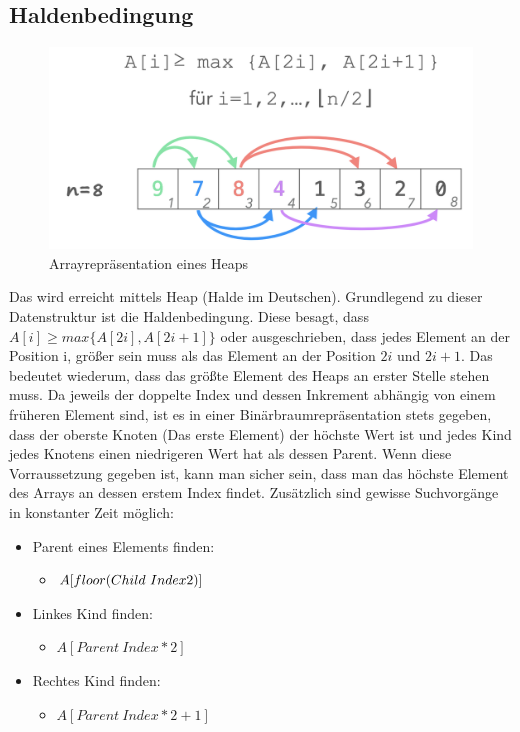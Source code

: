 \documentclass{article}
\begin{document}
	\subsection{Haldenbedingung}
	\begin{figure}[H]
	\centering
	\includegraphics{Bilder/heap.png}
	\caption{Arrayrepräsentation eines Heaps}
	\end{figure}
	Das wird erreicht mittels Heap (Halde im Deutschen). Grundlegend zu dieser Datenstruktur ist die Haldenbedingung. Diese besagt, dass $A[i]\geq max \{A[2i], A[2i+1]\}$ oder ausgeschrieben, dass jedes Element an der Position i, größer sein muss als das Element an der Position $2i$ und $2i+1$. Das bedeutet wiederum, dass das größte Element des Heaps an erster Stelle stehen muss. Da jeweils der doppelte Index und dessen Inkrement abhängig von einem früheren Element sind, ist es in einer Binärbraumrepräsentation stets gegeben, dass der oberste Knoten (Das erste Element) der höchste Wert ist und jedes Kind jedes Knotens einen niedrigeren Wert hat als dessen Parent. Wenn diese Vorraussetzung gegeben ist, kann man sicher sein, dass man das höchste Element des Arrays an dessen erstem Index findet. Zusätzlich sind gewisse Suchvorgänge in konstanter Zeit möglich:
	\begin{itemize}
		\item{Parent eines Elements finden:}
		\begin{itemize}
			\item{$A[floor(Child\ Index\/2)]$}
		\end{itemize}
		\item{Linkes Kind finden:}
		\begin{itemize}
			\item{$A[Parent\ Index*2]$}
		\end{itemize}
		\item{Rechtes Kind finden:}
		\begin{itemize}
			\item{$A[Parent\ Index*2+1]$}
		\end{itemize}
	\end{itemize}
\end{document}
